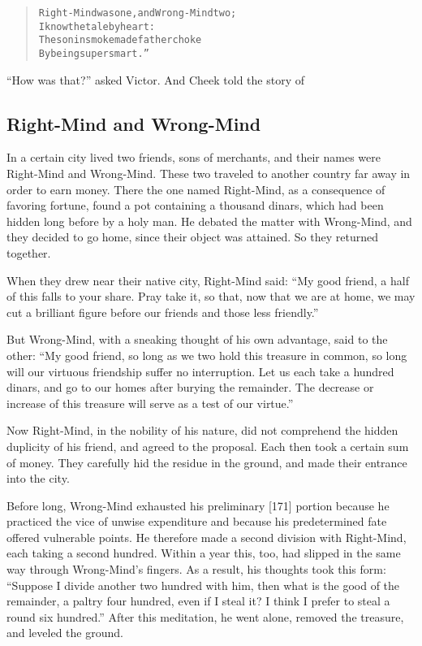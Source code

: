 \documentclass[article, twoside, 14pt]{memoir}
\renewenvironment{verbatim}{%
\begin{quote}%
\vskip -10pt%
\begin{alltt}\normalfont\large}{\end{alltt}%
\end{quote}%
\vskip -10pt
} %
\begin{document}
\begin{verbatim}
Right-Mind was one, and Wrong-Mind two;
    I know the tale by heart:
The son in smoke made father choke
    By being supersmart.”
\end{verbatim}
``How was that?'' asked Victor. And Cheek told the story of

\subsection{Right-Mind and Wrong-Mind}

\label{s29}

In a certain city lived two friends, sons of merchants, and their
names were Right-Mind and Wrong-Mind. These two traveled to another
country far away in order to earn money. There the one named
Right-Mind, as a consequence of favoring fortune, found a pot
containing a thousand dinars, which had been hidden long before by
a holy man. He debated the matter with Wrong-Mind, and they decided
to go home, since their object was attained. So they returned
together.

When they drew near their native city, Right-Mind said:
``My good friend, a half of this falls to your share. Pray take it, so that, now that we are at home, we may cut a brilliant figure before our friends and those less friendly.''

But Wrong-Mind, with a sneaking thought of his own advantage, said
to the other:
``My good friend, so long as we two hold this treasure in common, so long will our virtuous friendship suffer no interruption. Let us each take a hundred dinars, and go to our homes after burying the remainder. The decrease or increase of this treasure will serve as a test of our virtue.''

Now Right-Mind, in the nobility of his nature, did not comprehend
the hidden duplicity of his friend, and agreed to the proposal.
Each then took a certain sum of money. They carefully hid the
residue in the ground, and made their entrance into the city.

Before long, Wrong-Mind exhausted his preliminary [171] portion
because he practiced the vice of unwise expenditure and because his
predetermined fate offered vulnerable points. He therefore made a
second division with Right-Mind, each taking a second hundred.
Within a year this, too, had slipped in the same way through
Wrong-Mind's fingers. As a result, his thoughts took this form:
``Suppose I divide another two hundred with him, then what is the good of the remainder, a paltry four hundred, even if I steal it? I think I prefer to steal a round six hundred.''
After this meditation, he went alone, removed the treasure, and
leveled the ground.
\end{document}
